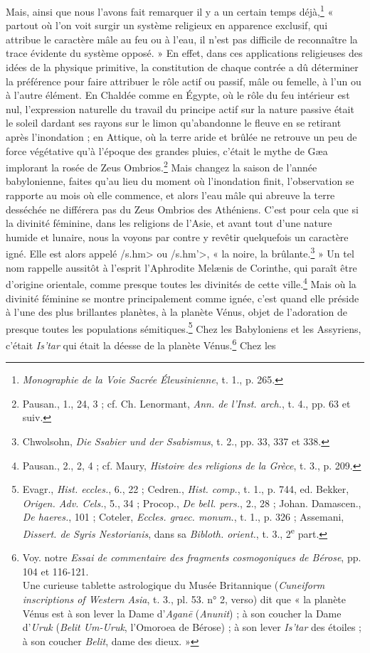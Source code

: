 \documentclass[a4paper, 11pt, oneside]{article}
\begin{document}
Mais, ainsi que nous l'avons fait remarquer il y a un certain temps déjà,\footnote{\emph{Monographie de la Voie Sacrée Éleusinienne}, t. 1., p. 265.} « partout où l'on voit surgir un système religieux en apparence exclusif, qui attribue le caractère mâle au feu ou à l'eau, il n'est pas difficile de reconnaître la trace évidente du système opposé. » En effet, dans ces applications religieuses des idées de la physique primitive, la constitution de chaque contrée a dû déterminer la préférence pour faire attribuer le rôle actif ou passif, mâle ou femelle, à l'un ou à l'autre élément. En Chaldée comme en Égypte, où le rôle du feu intérieur est nul, l'expression naturelle du travail du principe actif sur la nature passive était le soleil dardant ses rayons sur le limon qu'abandonne le fleuve en se retirant après l'inondation ; en Attique, où la terre aride et brûlée ne retrouve un peu de force végétative qu'à l'époque des grandes pluies, c'était le mythe de Gæa implorant la rosée de Zeus Ombrios.\footnote{Pausan., 1., 24, 3 ; cf. Ch. Lenormant, \emph{Ann. de l'Inst. arch.}, t. 4., pp. 63 et suiv.} Mais changez la saison de l'année babylonienne, faites qu'au lieu du moment où l'inondation finit, l'observation se rapporte au mois où elle commence, et alors l'eau mâle qui abreuve la terre desséchée ne différera pas du Zeus Ombrios des Athéniens. C'est pour cela que si la divinité féminine, dans les religions de l'Asie, et avant tout d'une nature humide et lunaire, nous la voyons par contre y revêtir quelquefois un caractère igné. Elle est alors appelé \</s.hm> ou \</s.hm'>, « la noire, la brûlante.\footnote{Chwolsohn, \emph{Die Ssabier und der Ssabismus}, t. 2., pp. 33, 337 et 338.} » Un tel nom rappelle aussitôt à l'esprit l'Aphrodite Melænis de Corinthe, qui paraît être d'origine orientale, comme presque toutes les divinités de cette ville.\footnote{Pausan., 2., 2, 4 ; cf. Maury, \emph{Histoire des religions de la Grèce}, t. 3., p. 209.} Mais où la divinité féminine se montre principalement comme ignée, c'est quand elle préside à l'une des plus brillantes planètes, à la planète Vénus, objet de l'adoration de presque toutes les populations sémitiques.\footnote{Evagr., \emph{Hist. eccles.}, 6., 22 ; Cedren., \emph{Hist. comp.}, t. 1., p. 744, ed. Bekker, \emph{Origen. Adv. Cels.}, 5., 34 ; Procop., \emph{De bell. pers.}, 2., 28 ; Johan. Damascen., \emph{De haeres.}, 101 ; Coteler, \emph{Eccles. graec. monum.}, t. 1., p. 326 ; Assemani, \emph{Dissert. de Syris Nestorianis}, dans sa \emph{Bibloth. orient.}, t. 3., 2\textsuperscript{e} part.} Chez les Babyloniens et les Assyriens, c'était \emph{Is'tar} qui était la déesse de la planète Vénus.\footnote{Voy. notre \emph{Essai de commentaire des fragments cosmogoniques de Bérose}, pp. 104 et 116-121.\\\hspace*{5mm}Une curieuse tablette astrologique du Musée Britannique (\emph{Cuneiform inscriptions of Western Asia}, t. 3., pl. 53. n° 2, verso) dit que « la planète Vénus est à son lever la Dame d'\emph{Agan\={e}} (\emph{Anunit}) ; à son coucher la Dame d'\emph{Uruk} (\emph{Belit Um-Uruk}, l'Omoroea de Bérose) ; à son lever \emph{Is'tar} des étoiles ; à son coucher \emph{Belit}, dame des dieux. »} Chez les 
\end{document}
